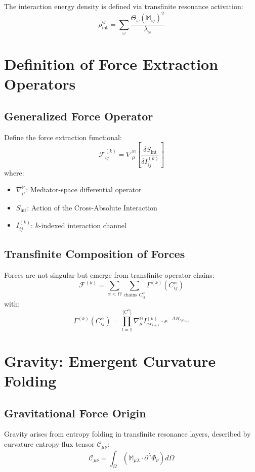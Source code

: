 \documentclass[11pt]{article}
\begin{document}
The interaction energy density is defined via transfinite resonance activation:
\[
\rho_{\text{int}}^{ij} = \sum_{\omega} \frac{\Theta_\omega(\mathbb{M}_{ij})^2}{\lambda_\omega}
\]

\section{Definition of Force Extraction Operators}

\subsection{Generalized Force Operator}

Define the force extraction functional:
\[
\mathscr{F}_{ij}^{(k)} = \nabla_{\mu}^{\mathbb{M}} \left[ \frac{\delta S_{\text{int}}}{\delta I_{ij}^{(k)}} \right]
\]
where:
\begin{itemize}[noitemsep]
    \item \(\nabla_{\mu}^{\mathbb{M}}\): Mediator-space differential operator
    \item \(S_{\text{int}}\): Action of the Cross-Absolute Interaction
    \item \(I_{ij}^{(k)}\): $k$-indexed interaction channel
\end{itemize}

\subsection{Transfinite Composition of Forces}

Forces are not singular but emerge from transfinite operator chains:
\[
\mathscr{F}^{(k)} = \sum_{\alpha < \Omega} \sum_{\text{chains } C^\alpha_{ij}} \Gamma^{(k)}(C^\alpha_{ij})
\]
with:
\[
\Gamma^{(k)}(C^\alpha_{ij}) = \prod_{l=1}^{|C^\alpha|} \nabla^{\mathbb{M}}_\mu I_{c_l c_{l+1}}^{(k)} \cdot e^{-\Delta H_{c_l c_{l+1}}}
\]

\section{Gravity: Emergent Curvature Folding}

\subsection{Gravitational Force Origin}

Gravity arises from entropy folding in transfinite resonance layers, described by curvature entropy flux tensor \(\mathscr{C}_{\mu\nu}\):
\[
\mathscr{C}_{\mu\nu} = \int_\Omega \left( \mathbb{M}_{\mu\lambda} \cdot \partial^\lambda \Phi_\nu \right) d\Omega
\]
\end{document}
